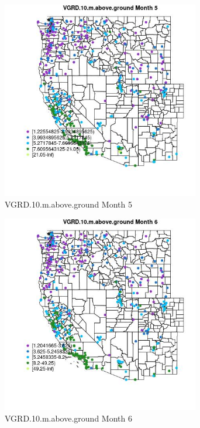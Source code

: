 \begin{figure} 
\centering  
\includegraphics[width=0.77\textwidth]{Code_Outputs/ML_input_report_ML_input_PM25_Step5_part_d_de_duplicated_aves_ML_input_MapObsMo5VGRD10maboveground.jpg} 
\caption{\label{fig:ML_input_report_ML_input_PM25_Step5_part_d_de_duplicated_aves_ML_inputMapObsMo5VGRD10maboveground}VGRD.10.m.above.ground Month 5} 
\end{figure} 
 

\begin{figure} 
\centering  
\includegraphics[width=0.77\textwidth]{Code_Outputs/ML_input_report_ML_input_PM25_Step5_part_d_de_duplicated_aves_ML_input_MapObsMo6VGRD10maboveground.jpg} 
\caption{\label{fig:ML_input_report_ML_input_PM25_Step5_part_d_de_duplicated_aves_ML_inputMapObsMo6VGRD10maboveground}VGRD.10.m.above.ground Month 6} 
\end{figure} 
 

